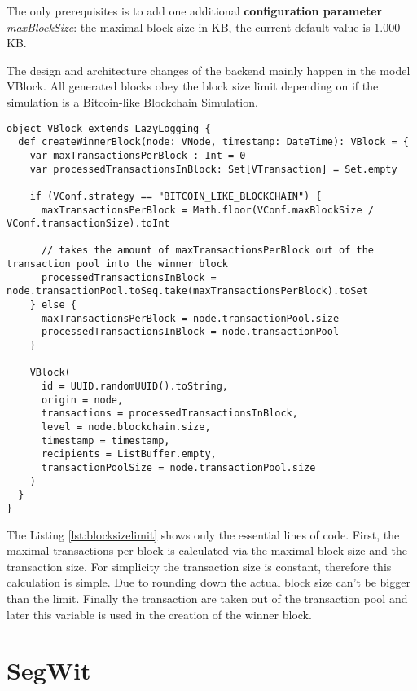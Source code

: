 The only prerequisites is to add one additional \textbf{configuration parameter} \textit{maxBlockSize}: the maximal block size in KB, the current default value is 1.000 KB.

The design and architecture changes of the backend mainly happen in the model VBlock. All generated blocks obey the block size limit depending on if the simulation is a Bitcoin-like Blockchain Simulation.

\begin{minipage}{\linewidth}
\begin{lstlisting}[style=myScalastyle,label=lst:blocksizelimit,caption={VBlock with focus on block size limit}]
object VBlock extends LazyLogging {
  def createWinnerBlock(node: VNode, timestamp: DateTime): VBlock = {
    var maxTransactionsPerBlock : Int = 0
    var processedTransactionsInBlock: Set[VTransaction] = Set.empty

    if (VConf.strategy == "BITCOIN_LIKE_BLOCKCHAIN") {
      maxTransactionsPerBlock = Math.floor(VConf.maxBlockSize / VConf.transactionSize).toInt    
      
      // takes the amount of maxTransactionsPerBlock out of the transaction pool into the winner block
      processedTransactionsInBlock = node.transactionPool.toSeq.take(maxTransactionsPerBlock).toSet
    } else {
      maxTransactionsPerBlock = node.transactionPool.size
      processedTransactionsInBlock = node.transactionPool
    }
    
    VBlock(
      id = UUID.randomUUID().toString,
      origin = node,
      transactions = processedTransactionsInBlock,
      level = node.blockchain.size,
      timestamp = timestamp,
      recipients = ListBuffer.empty,
      transactionPoolSize = node.transactionPool.size
    )
  }
}
\end{lstlisting}
\end{minipage}

The Listing \ref{lst:blocksizelimit} shows only the essential lines of code. First, the maximal transactions per block is calculated via the maximal block size and the transaction size. For simplicity the transaction size is constant, therefore this calculation is simple. Due to rounding down the actual block size can't be bigger than the limit. Finally the transaction are taken out of the transaction pool and later this variable is used in the creation of the winner block.

\section{SegWit \label{subsection:segwit}}

